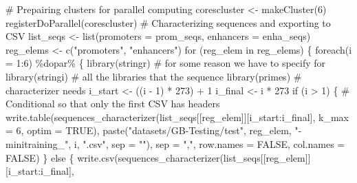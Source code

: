 \documentclass[
  letterpaper,
  DIV=11,
  numbers=noendperiod]{scrartcl}
\newenvironment{Shaded}{\begin{snugshade}}{\end{snugshade}}
\newcommand{\AttributeTok}[1]{\textcolor[rgb]{0.40,0.45,0.13}{#1}}
\newcommand{\CommentTok}[1]{\textcolor[rgb]{0.37,0.37,0.37}{#1}}
\newcommand{\ConstantTok}[1]{\textcolor[rgb]{0.56,0.35,0.01}{#1}}
\newcommand{\ControlFlowTok}[1]{\textcolor[rgb]{0.00,0.23,0.31}{#1}}
\newcommand{\DecValTok}[1]{\textcolor[rgb]{0.68,0.00,0.00}{#1}}
\newcommand{\FunctionTok}[1]{\textcolor[rgb]{0.28,0.35,0.67}{#1}}
\newcommand{\NormalTok}[1]{\textcolor[rgb]{0.00,0.23,0.31}{#1}}
\newcommand{\OtherTok}[1]{\textcolor[rgb]{0.00,0.23,0.31}{#1}}
\newcommand{\SpecialCharTok}[1]{\textcolor[rgb]{0.37,0.37,0.37}{#1}}
\newcommand{\StringTok}[1]{\textcolor[rgb]{0.13,0.47,0.30}{#1}}
\begin{document}
\begin{Shaded}
\begin{Highlighting}[]
\CommentTok{\# Prepairing clusters for parallel computing}
\NormalTok{corescluster }\OtherTok{\textless{}{-}} \FunctionTok{makeCluster}\NormalTok{(}\DecValTok{6}\NormalTok{)}
\FunctionTok{registerDoParallel}\NormalTok{(corescluster)}
\CommentTok{\# Characterizing sequences and exporting to CSV}
\NormalTok{list\_seqs }\OtherTok{\textless{}{-}} \FunctionTok{list}\NormalTok{(}\AttributeTok{promoters =}\NormalTok{ prom\_seqs, }\AttributeTok{enhancers =}\NormalTok{ enha\_seqs)}
\NormalTok{reg\_elems }\OtherTok{\textless{}{-}} \FunctionTok{c}\NormalTok{(}\StringTok{"promoters"}\NormalTok{, }\StringTok{"enhancers"}\NormalTok{)}
\ControlFlowTok{for}\NormalTok{ (reg\_elem }\ControlFlowTok{in}\NormalTok{ reg\_elems) \{}
  \FunctionTok{foreach}\NormalTok{(}\AttributeTok{i =} \DecValTok{1}\SpecialCharTok{:}\DecValTok{6}\NormalTok{) }\SpecialCharTok{\%dopar\%}\NormalTok{ \{}
    \FunctionTok{library}\NormalTok{(stringr) }\CommentTok{\# for some reason we have to specify for}
    \FunctionTok{library}\NormalTok{(stringi) }\CommentTok{\# all the libraries that the sequence}
    \FunctionTok{library}\NormalTok{(primes)  }\CommentTok{\# characterizer needs}
\NormalTok{    i\_start }\OtherTok{\textless{}{-}}\NormalTok{ ((i }\SpecialCharTok{{-}} \DecValTok{1}\NormalTok{) }\SpecialCharTok{*} \DecValTok{273}\NormalTok{) }\SpecialCharTok{+} \DecValTok{1}
\NormalTok{    i\_final }\OtherTok{\textless{}{-}}\NormalTok{ i }\SpecialCharTok{*} \DecValTok{273}
    \ControlFlowTok{if}\NormalTok{ (i }\SpecialCharTok{\textgreater{}} \DecValTok{1}\NormalTok{) \{     }\CommentTok{\# Conditional so that only the first CSV has headers}
      \FunctionTok{write.table}\NormalTok{(}\FunctionTok{sequences\_characterizer}\NormalTok{(list\_seqs[[reg\_elem]][i\_start}\SpecialCharTok{:}\NormalTok{i\_final],}
                                          \AttributeTok{k\_max =} \DecValTok{6}\NormalTok{, }\AttributeTok{optim =} \ConstantTok{TRUE}\NormalTok{),}
                  \FunctionTok{paste}\NormalTok{(}\StringTok{"datasets/GB{-}Testing/test"}\NormalTok{, reg\_elem, }\StringTok{"{-}minitraining\_"}\NormalTok{,}
\NormalTok{                        i, }\StringTok{".csv"}\NormalTok{, }\AttributeTok{sep =} \StringTok{""}\NormalTok{), }\AttributeTok{sep =} \StringTok{","}\NormalTok{,}
                  \AttributeTok{row.names =} \ConstantTok{FALSE}\NormalTok{, }\AttributeTok{col.names =} \ConstantTok{FALSE}\NormalTok{)}
\NormalTok{    \} }\ControlFlowTok{else}\NormalTok{ \{}
      \FunctionTok{write.csv}\NormalTok{(}\FunctionTok{sequences\_characterizer}\NormalTok{(list\_seqs[[reg\_elem]][i\_start}\SpecialCharTok{:}\NormalTok{i\_final],}

\end{Highlighting}
\end{Shaded}
\end{document}

